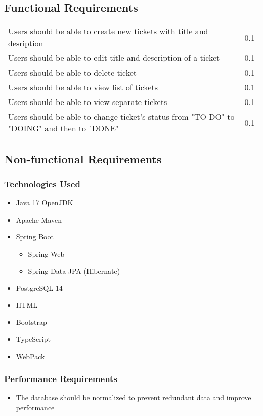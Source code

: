 \documentclass[a4paper]{article}
\begin{document}
    \subsection{Functional Requirements}
    \begin{table}[htbp]
        \centering
        \begin{tabularx}{\linewidth}{|X|l|}
            \hline
            \centering{Description} & \centering{Version} \tabularnewline \hline
            Users should be able to create new tickets with title and desription & 0.1 \tabularnewline \hline
            Users should be able to edit title and description of a ticket & 0.1 \tabularnewline \hline
            Users should be able to delete ticket & 0.1 \tabularnewline \hline
            Users should be able to view list of tickets & 0.1 \tabularnewline \hline
            Users should be able to view separate tickets & 0.1 \tabularnewline \hline
            Users should be able to change ticket's status from "TO DO" to "DOING" and then to "DONE" & 0.1 \tabularnewline \hline
        \end{tabularx}
    \end{table}

    \subsection{Non-functional Requirements}
    \subsubsection{Technologies Used}
    \begin{itemize}
        \item Java 17 OpenJDK
        \item Apache Maven
        \item Spring Boot
        \begin{itemize}
            \item Spring Web
            \item Spring Data JPA (Hibernate)
        \end{itemize}
        \item PostgreSQL 14
        \item HTML
        \item Bootstrap
        \item TypeScript
        \item WebPack
    \end{itemize}

    \subsubsection{Performance Requirements}
    \begin{itemize}
        \item The database should be normalized to prevent redundant data and improve performance
    \end{itemize}
\end{document}
